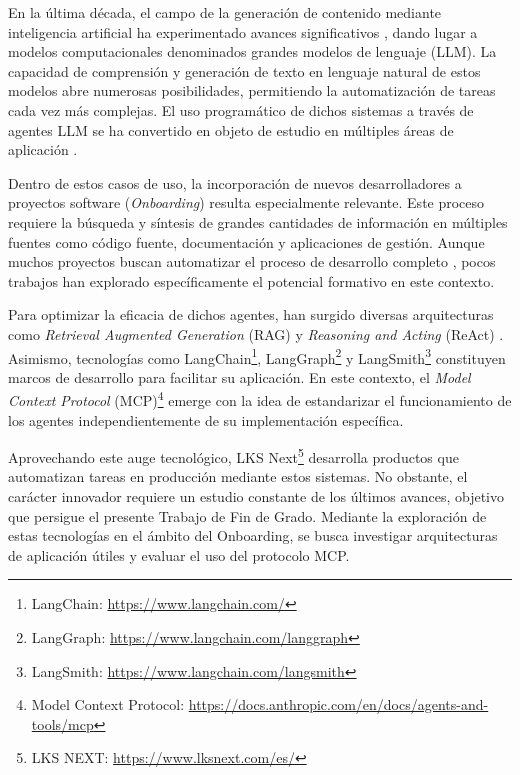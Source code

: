 En la última década, el campo de la generación de contenido mediante inteligencia artificial ha experimentado avances significativos \cite{vaswani_attention_2023}, dando lugar a modelos computacionales denominados grandes modelos de lenguaje (LLM). La capacidad de comprensión y generación de texto en lenguaje natural de estos modelos abre numerosas posibilidades, permitiendo la automatización de tareas cada vez más complejas. El uso programático de dichos sistemas a través de agentes LLM se ha convertido en objeto de estudio en múltiples áreas de aplicación \cite{noauthor_design_nodate, singh_exploring_2023, dong_self-collaboration_2024}.

Dentro de estos casos de uso, la incorporación de nuevos desarrolladores a proyectos software (\textit{Onboarding}) resulta especialmente relevante. Este proceso requiere la búsqueda y síntesis de grandes cantidades de información en múltiples fuentes como código fuente, documentación y aplicaciones de gestión. Aunque muchos proyectos buscan automatizar el proceso de desarrollo completo \cite{qian_chatdev_2024, acharya_devin_2025, noauthor_aider-aiaider_2025}, pocos trabajos han explorado específicamente el potencial formativo en este contexto.

Para optimizar la eficacia de dichos agentes, han surgido diversas arquitecturas como \textit{Retrieval Augmented Generation} (RAG) \cite{gao_retrieval-augmented_2024} y \textit{Reasoning and Acting} (ReAct) \cite{yao_react_2023}. Asimismo, tecnologías como LangChain\footnote{LangChain: \url{https://www.langchain.com/}}, LangGraph\footnote{LangGraph: \url{https://www.langchain.com/langgraph}} y LangSmith\footnote{LangSmith: \url{https://www.langchain.com/langsmith}} constituyen marcos de desarrollo para facilitar su aplicación. En este contexto, el \textit{Model Context Protocol} (MCP)\footnote{Model Context Protocol: \url{https://docs.anthropic.com/en/docs/agents-and-tools/mcp}} emerge con la idea de estandarizar el funcionamiento de los agentes independientemente de su implementación específica.


Aprovechando este auge tecnológico, LKS Next\footnote{LKS NEXT: \url{https://www.lksnext.com/es/}} desarrolla productos que automatizan tareas en producción mediante estos sistemas. No obstante, el carácter innovador requiere un estudio constante de los últimos avances, objetivo que persigue el presente Trabajo de Fin de Grado. Mediante la exploración de estas tecnologías en el ámbito del Onboarding, se busca investigar arquitecturas de aplicación útiles y evaluar el uso del protocolo MCP.

